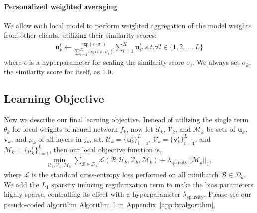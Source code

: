 \paragraph{Personalized weighted averaging} We allow each local model to perform weighted aggregation of the model weights from other clients, utilizing their similarity scores:
\begin{equation}
\begin{split}
\textbf{u}_{k}^l \leftarrow \frac{\text{exp}({\epsilon \cdot \sigma_i})}{\sum_{i=1}^K \text{exp}(\epsilon \cdot \sigma_i)} \sum_{i=1}^{K} \textbf{u}_i^l, s.t. \forall  l \in \{1,2,\dots,L\}
\end{split}
\end{equation}
where $\epsilon$ is a hyperparameter for scaling the similarity score $\sigma_i$. We always set $\sigma_k$, the similarity score for itself, as $1.0$. 

\subsection{Learning Objective}
\label{subsec:algo}

Now we describe our final learning objective. Instead of utilizing the single term $\theta_k$ for local weights of neural network $f_k$, now let $\mathcal{U}_k$, $\mathcal{V}_k$, and $\mathcal{M}_k$ be sets of $\textbf{u}_k$, $\textbf{v}_k$, and $\mu_k$ of all layers in $f_k$, s.t. $\mathcal{U}_k=\{\textbf{u}^{i}_k\}^{L}_{i=1}$, $\mathcal{V}_k=\{\textbf{v}^{i}_k\}^{L}_{i=1}$, and $\mathcal{M}_k=\{{\mu}^{i}_k\}^{L}_{i=1}$, then our local objective function is,
\begin{equation}
\begin{split}
\min_{\mathcal{U}_k,\mathcal{V}_k,\mathcal{M}_k} \sum_{\mathcal{B} \in \mathcal{D}_k} \mathcal{L}(\mathcal{B}; \mathcal{U}_k, \mathcal{V}_k, \mathcal{M}_k) + \lambda_{\text{sparsity}} ||\mathcal{M}_k||_1,
\end{split}
\label{eq:loss}
\end{equation}
where $\mathcal{L}$ is the standard cross-entropy loss performed on all minibatch $\mathcal{B} \in \mathcal{D}_k$. We add the $L_1$ sparsity inducing regularization term to make the bias parameters highly sparse, controlling its effect with a hyperparameter $\lambda_{\text{sparsity}}$. Please see our pseudo-coded algorithm Algorithm 1 in Appendix~\ref{appdx:algorithm}.














